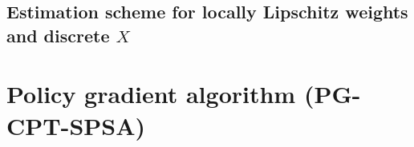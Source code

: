 \documentclass[11pt,letterpaper,english]{article}
\begin{document}
\subsection{Estimation scheme for locally Lipschitz weights and discrete $X$}

\section{Policy gradient algorithm (PG-CPT-SPSA)}
\label{sec:1spsa}
\end{document}
